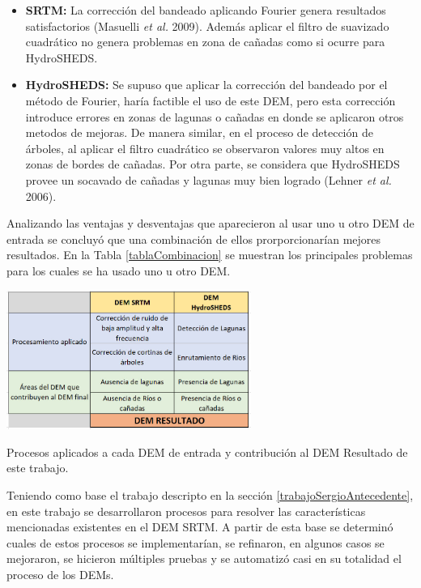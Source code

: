 \documentclass[10pt,a4paper, twoside]{report}
\begin{document}
\begin{itemize}
	\item \textbf{SRTM:} La corrección del bandeado aplicando Fourier genera resultados satisfactorios (Masuelli \textit{et al.} 2009). Además aplicar el filtro de suavizado cuadrático no genera problemas en zona de cañadas como si ocurre para HydroSHEDS.
	\item \textbf{HydroSHEDS:} Se supuso que aplicar la corrección del bandeado por el método de Fourier, haría factible el uso de este DEM, pero esta corrección introduce errores en zonas de lagunas o cañadas en donde se aplicaron otros metodos de mejoras. De manera similar, en el proceso de detección de árboles, al aplicar el filtro cuadrático se observaron valores muy altos en zonas de bordes de cañadas. Por otra parte, se considera que HydroSHEDS provee un socavado de cañadas y lagunas muy bien logrado (Lehner \textit{et al.} 2006).
\end{itemize}

Analizando las ventajas y desventajas que aparecieron al usar uno u otro DEM de entrada se concluyó que una combinación de ellos prorporcionarían mejores resultados. En la Tabla \ref{tablaCombinacion} se muestran los principales problemas para los cuales se ha usado uno u otro DEM. 

\begin{table}[H]
   \centering      
   \includegraphics[width=0.6\textwidth]{imagenes/tablaCombinacion.jpg}
 \caption{Procesos aplicados a cada DEM de entrada y contribución al DEM Resultado de este trabajo.}
 \label{tablaCombinacion}
\end{table}

Teniendo como base el trabajo descripto en la sección \ref{trabajoSergioAntecedente}, en este trabajo se desarrollaron procesos para resolver las características mencionadas existentes en el DEM SRTM. A partir de esta base se determinó cuales de estos procesos se implementarían, se refinaron, en algunos casos se mejoraron, se hicieron múltiples pruebas y se automatizó casi en su totalidad el proceso de los DEMs.
\end{document}
